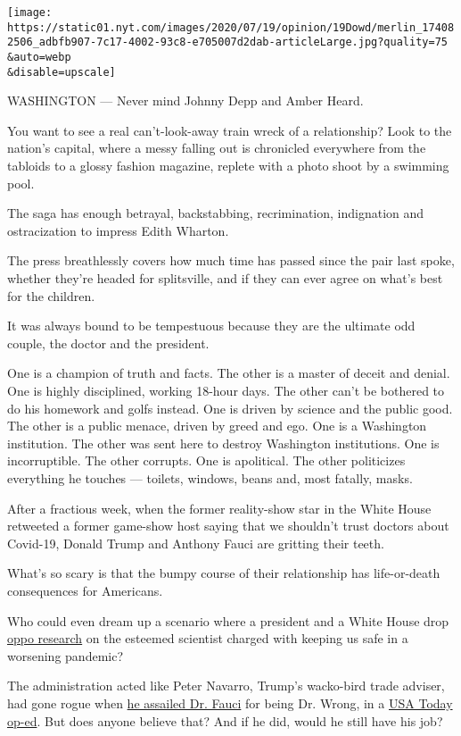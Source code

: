 \texttt{[image: https://static01.nyt.com/images/2020/07/19/opinion/19Dowd/merlin\_174082506\_adbfb907-7c17-4002-93c8-e705007d2dab-articleLarge.jpg?quality=75\\\&auto=webp\\\&disable=upscale]}

WASHINGTON --- Never mind Johnny Depp and Amber Heard.

You want to see a real can't-look-away train wreck of a relationship?
Look to the nation's capital, where a messy falling out is chronicled
everywhere from the tabloids to a glossy fashion magazine, replete with
a photo shoot by a swimming pool.

The saga has enough betrayal, backstabbing, recrimination, indignation
and ostracization to impress Edith Wharton.

The press breathlessly covers how much time has passed since the pair
last spoke, whether they're headed for splitsville, and if they can ever
agree on what's best for the children.

It was always bound to be tempestuous because they are the ultimate odd
couple, the doctor and the president.

One is a champion of truth and facts. The other is a master of deceit
and denial. One is highly disciplined, working 18-hour days. The other
can't be bothered to do his homework and golfs instead. One is driven by
science and the public good. The other is a public menace, driven by
greed and ego. One is a Washington institution. The other was sent here
to destroy Washington institutions. One is incorruptible. The other
corrupts. One is apolitical. The other politicizes everything he touches
--- toilets, windows, beans and, most fatally, masks.

After a fractious week, when the former reality-show star in the White
House retweeted a former game-show host saying that we shouldn't trust
doctors about Covid-19, Donald Trump and Anthony Fauci are gritting
their teeth.

What's so scary is that the bumpy course of their relationship has
life-or-death consequences for Americans.

Who could even dream up a scenario where a president and a White House
drop
\href{https://www.axios.com/mcenany-white-house-opposition-research-fauci-3e84b7ea-a368-48a2-9061-216a14a38612.html}{oppo
research} on the esteemed scientist charged with keeping us safe in a
worsening pandemic?

The administration acted like Peter Navarro, Trump's wacko-bird trade
adviser, had gone rogue when
\href{https://www.nytimes.com/2020/07/16/business/media/usa-today-peter-navarro-fauci.html}{he
assailed Dr. Fauci} for being Dr. Wrong, in a
\href{https://www.usatoday.com/story/opinion/todaysdebate/2020/07/14/anthony-fauci-wrong-with-me-peter-navarro-editorials-debates/5439374002/}{USA
Today op-ed}. But does anyone believe that? And if he did, would he
still have his job?

